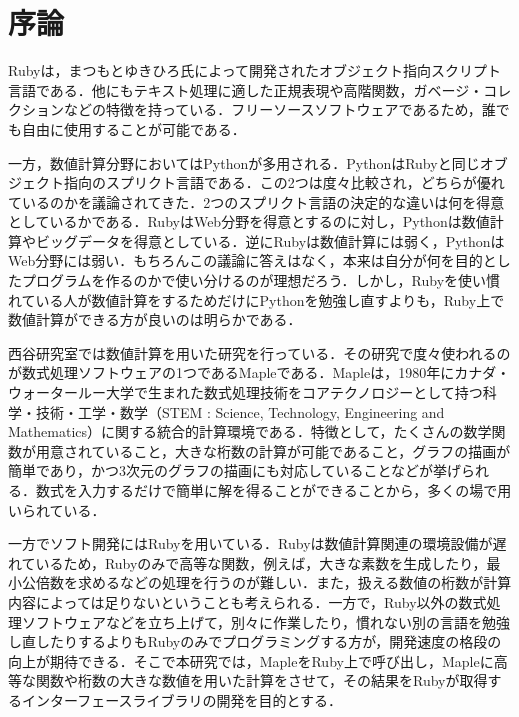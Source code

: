 \section{序論}
Rubyは，まつもとゆきひろ氏によって開発されたオブジェクト指向スクリプト言語である．他にもテキスト処理に適した正規表現や高階関数，ガベージ・コレクションなどの特徴を持っている．フリーソースソフトウェアであるため，誰でも自由に使用することが可能である．

一方，数値計算分野においてはPythonが多用される．PythonはRubyと同じオブジェクト指向のスプリクト言語である．この2つは度々比較され，どちらが優れているのかを議論されてきた．2つのスプリクト言語の決定的な違いは何を得意としているかである．RubyはWeb分野を得意とするのに対し，Pythonは数値計算やビッグデータを得意としている．逆にRubyは数値計算には弱く，PythonはWeb分野には弱い．もちろんこの議論に答えはなく，本来は自分が何を目的としたプログラムを作るのかで使い分けるのが理想だろう．しかし，Rubyを使い慣れている人が数値計算をするためだけにPythonを勉強し直すよりも，Ruby上で数値計算ができる方が良いのは明らかである．

西谷研究室では数値計算を用いた研究を行っている．その研究で度々使われるのが数式処理ソフトウェアの1つであるMapleである．Mapleは，1980年にカナダ・ウォータールー大学で生まれた数式処理技術をコアテクノロジーとして持つ科学・技術・工学・数学（STEM : Science, Technology, Engineering and Mathematics）に関する統合的計算環境である\cite{listings1}．特徴として，たくさんの数学関数が用意されていること，大きな桁数の計算が可能であること，グラフの描画が簡単であり，かつ3次元のグラフの描画にも対応していることなどが挙げられる．数式を入力するだけで簡単に解を得ることができることから，多くの場で用いられている．

一方でソフト開発にはRubyを用いている．Rubyは数値計算関連の環境設備が遅れているため，Rubyのみで高等な関数，例えば，大きな素数を生成したり，最小公倍数を求めるなどの処理を行うのが難しい．また，扱える数値の桁数が計算内容によっては足りないということも考えられる．一方で，Ruby以外の数式処理ソフトウェアなどを立ち上げて，別々に作業したり，慣れない別の言語を勉強し直したりするよりもRubyのみでプログラミングする方が，開発速度の格段の向上が期待できる．そこで本研究では，MapleをRuby上で呼び出し，Mapleに高等な関数や桁数の大きな数値を用いた計算をさせて，その結果をRubyが取得するインターフェースライブラリの開発を目的とする．

